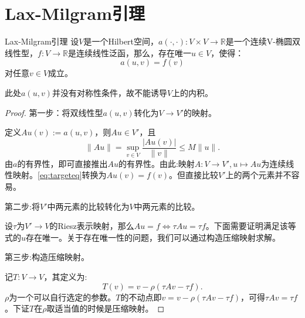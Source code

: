 \documentclass[lang=cn,10pt,newtx]{elegantbook}
\newcommand{\norm}[1]{\|#1\|}
\begin{document}
\section{Lax-Milgram引理}
\begin{theorem}{Lax-Milgram引理}
  设$V$是一个Hilbert空间，$a(\cdot,\cdot):V\times V\rightarrow\mathbb{R}$是一个连续V-椭圆双线性型，$f:V\rightarrow\mathbb{R}$是连续线性泛函，那么，存在唯一$u\in V$，使得：
  \begin{equation}
    \label{eq:targeteq}
    a(u,v)=f(v)
  \end{equation}
  对任意$v\in V$成立。
\end{theorem}
\begin{remark}
  此处$a(u,v)$并没有对称性条件，故不能诱导$V$上的内积。
\end{remark}
\begin{proof}
  第一步：将双线性型$a(u,v)$转化为$V\rightarrow V'$的映射。

  定义$Au(v):=a(u,v)$，则$Au\in V'$，且
  \begin{equation}
    \norm{Au}=\sup_{v\in V}\frac{|Au(v)|}{\norm{v}}\le M\norm{u}.
  \end{equation}
  由$a$的有界性，即可直接推出$Au$的有界性。由此:映射$A:V\rightarrow V',u\mapsto Au$为连续线性映射。\eqref{eq:targeteq}转换为$Au(v)=f(v)$。但直接比较$V'$上的两个元素并不容易。

  第二步:将$V'$中两元素的比较转化为$V$中两元素的比较。

  设$\tau$为$V'\rightarrow V$的Riesz表示映射，那么$Au=f\Leftrightarrow\tau Au=\tau f$。下面需要证明满足该等式的$u$存在唯一。关于存在唯一性的问题，我们可以通过构造压缩映射求解。

  第三步:构造压缩映射。

  记$T:V\rightarrow V$，其定义为:
  \begin{equation}
    T(v)=v-\rho(\tau Av-\tau f).
  \end{equation}
  $\rho$为一个可以自行选定的参数。$T$的不动点即$v=v-\rho(\tau Av-\tau f)$，可得$\tau Av=\tau f$。下证$T$在$\rho$取适当值的时候是压缩映射。


\end{proof}
\end{document}
